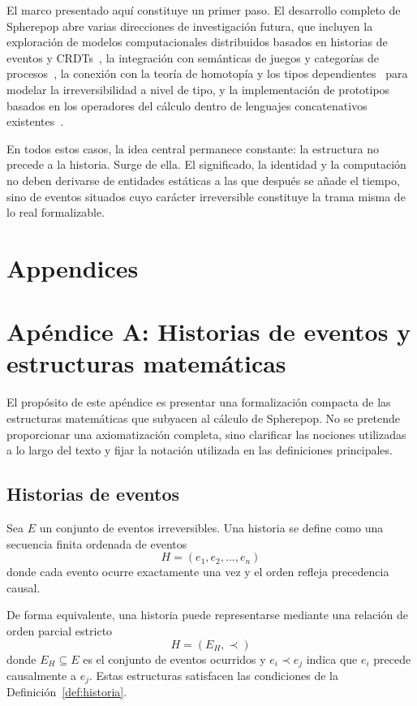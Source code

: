 \documentclass[12pt]{article}
\theoremstyle{plain}
\theoremstyle{definition}
\begin{document}
El marco presentado aquí constituye un primer paso. El desarrollo completo de Spherepop abre varias direcciones de investigación futura, que incluyen la exploración de modelos computacionales distribuidos basados en historias de eventos y CRDTs~\cite{shapiro,lamport}, la integración con semánticas de juegos y categorías de procesos~\cite{abramsky,baez}, la conexión con la teoría de homotopía y los tipos dependientes~\cite{homotopy,martinlof} para modelar la irreversibilidad a nivel de tipo, y la implementación de prototipos basados en los operadores del cálculo dentro de lenguajes concatenativos existentes~\cite{moore,okasaki}.

En todos estos casos, la idea central permanece constante: la estructura no precede a la historia. Surge de ella. El significado, la identidad y la computación no deben derivarse de entidades estáticas a las que después se añade el tiempo, sino de eventos situados cuyo carácter irreversible constituye la trama misma de lo real formalizable.

\newpage
\section*{Appendices}
\appendix

\section{Apéndice A: Historias de eventos y estructuras matemáticas}
\label{ap:historias}

El propósito de este apéndice es presentar una formalización compacta de las estructuras matemáticas que subyacen al cálculo de Spherepop. No se pretende proporcionar una axiomatización completa, sino clarificar las nociones utilizadas a lo largo del texto y fijar la notación utilizada en las definiciones principales.

\subsection{Historias de eventos}

Sea $E$ un conjunto de eventos irreversibles. Una historia se define como una secuencia finita ordenada de eventos
\[
H = (e_1, e_2, \ldots, e_n)
\]
donde cada evento ocurre exactamente una vez y el orden refleja precedencia causal.

De forma equivalente, una historia puede representarse mediante una relación de orden parcial estricto
\[
H = (E_H, \prec)
\]
donde $E_H \subseteq E$ es el conjunto de eventos ocurridos y $e_i \prec e_j$ indica que $e_i$ precede causalmente a $e_j$. Estas estructuras satisfacen las condiciones de la Definición~\ref{def:historia}.
\end{document}
